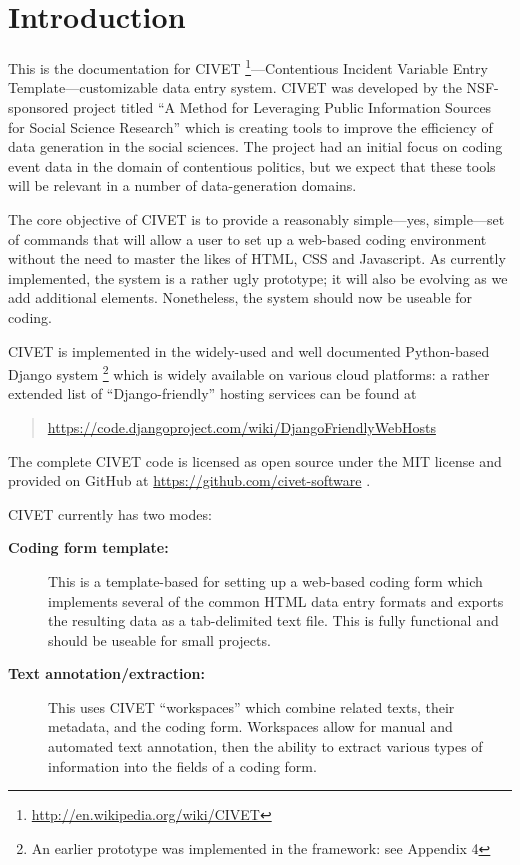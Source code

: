\documentclass[letterpaper,10pt,english]{sphinxmanual}
\begin{document}
\chapter{Introduction}
\label{intro:introduction}\label{intro::doc}\label{intro:id1}
This is the documentation for
CIVET \footnote{
\href{http://en.wikipedia.org/wiki/CIVET}{http://en.wikipedia.org/wiki/CIVET}
}—Contentious Incident Variable Entry Template—customizable
data entry system. CIVET was developed by the NSF-sponsored project
titled “A Method for Leveraging Public Information Sources for Social
Science Research” which is creating tools to improve the efficiency of
data generation in the social sciences. The project had an initial focus
on coding event data in the domain of contentious politics, but we
expect that these tools will be relevant in a number of data-generation
domains.

The core objective of CIVET is to provide a reasonably simple—yes,
simple—set of commands that will allow a user to set up a web-based
coding environment without the need to master the likes of HTML, CSS and
Javascript. As currently implemented, the system is a rather ugly
prototype; it will also be evolving as we add additional elements.
Nonetheless, the system should now be useable for coding.

CIVET is implemented in the widely-used and well documented
Python-based Django system \footnote{
An earlier prototype was implemented in the  framework: see
Appendix 4
} which is widely available on various
cloud platforms: a rather extended list of “Django-friendly” hosting
services can be found at
\begin{quote}

\href{https://code.djangoproject.com/wiki/DjangoFriendlyWebHosts}{https://code.djangoproject.com/wiki/DjangoFriendlyWebHosts}
\end{quote}

The complete CIVET code is licensed as open source under the MIT
license and provided on GitHub at \href{https://github.com/civet-software}{https://github.com/civet-software} .

CIVET currently has two modes:
\begin{description}
\item[{\textbf{Coding form template:}}] \leavevmode
This is a template-based for setting up a web-based coding form
which implements several of the common HTML data entry formats and
exports the resulting data as a tab-delimited text file. This is
fully functional and should be useable for small projects.

\item[{\textbf{Text annotation/extraction:}}] \leavevmode
This uses CIVET “workspaces” which combine related texts, their
metadata, and the coding form. Workspaces allow for manual and
automated text annotation, then the ability to extract various types
of information into the fields of a coding form.

\end{description}
\end{document}
